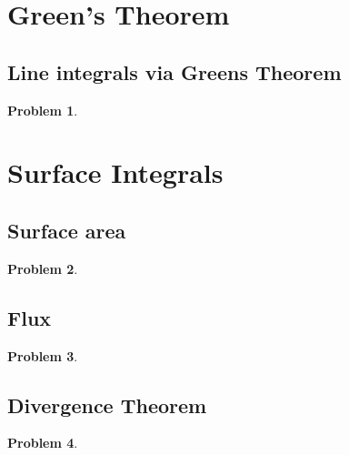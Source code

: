\documentclass{article}
\newtheorem{problem}{Problem}
\begin{document}
\section{Green's Theorem}
\subsection{Line integrals via Greens Theorem}
\begin{problem}

\end{problem}
\section{Surface Integrals}
\subsection{Surface area}
\begin{problem}

\end{problem}
\subsection{Flux}
\begin{problem}

\end{problem}
\subsection{Divergence Theorem }
\begin{problem}

\end{problem}
\end{document}
